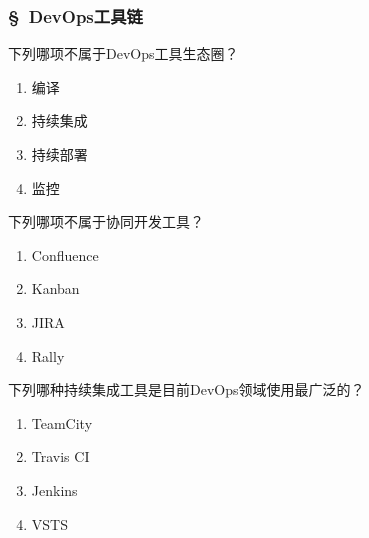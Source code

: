 \subsubsection*{\S\ DevOps工具链}
\setcounter{problemname}{0}

\begin{problem}
	下列哪项不属于DevOps工具生态圈？
    \vspace{-0.8em}
    \begin{multicols}{4}
        \begin{enumerate}[label=\Alph*.]
            \item 编译
            \item 持续集成
            \item 持续部署
            \item 监控
        \end{enumerate}
    \end{multicols}
    \vspace{-1em}
\end{problem}



\begin{problem}
	下列哪项不属于协同开发工具？
    \vspace{-0.8em}
    \begin{multicols}{4}
        \begin{enumerate}[label=\Alph*.]
            \item Confluence
            \item Kanban
            \item JIRA
            \item Rally
        \end{enumerate}
    \end{multicols}
    \vspace{-1em}
\end{problem}


\begin{problem}
	下列哪种持续集成工具是目前DevOps领域使用最广泛的？
    \vspace{-0.8em}
    \begin{multicols}{4}
        \begin{enumerate}[label=\Alph*.]
            \item TeamCity
            \item Travis CI
            \item Jenkins
            \item VSTS
        \end{enumerate}
    \end{multicols}
    \vspace{-1em}
\end{problem}


